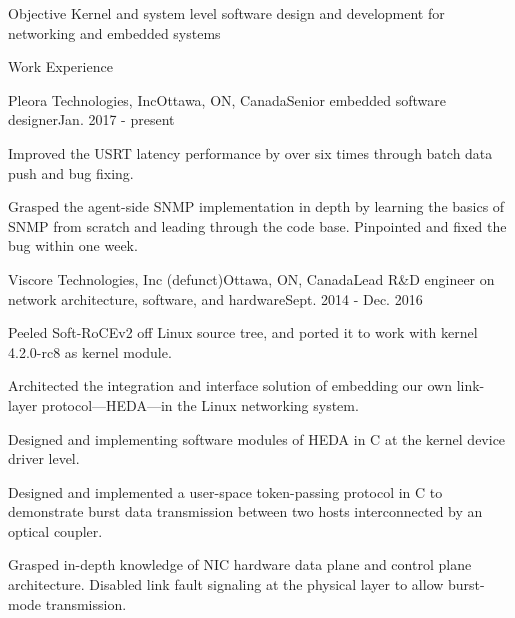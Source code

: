 \documentclass{resume} %
\begin{document}

\begin{rSection}{Objective}
Kernel and system level software design and development for networking and embedded systems
\end{rSection}


\begin{rSection}{Work Experience}

\begin{rSubsection}{Pleora Technologies, Inc}{Ottawa, ON, Canada}{Senior embedded software designer}{Jan. 2017 - present}
\item Improved the USRT latency performance by over six times through batch data push and bug fixing.
\item Grasped the agent-side SNMP implementation in depth by learning the basics of SNMP from scratch and leading through the code base.
Pinpointed and fixed the bug within one week.
\end{rSubsection}


\begin{rSubsection}{Viscore Technologies, Inc (defunct)}{Ottawa, ON, Canada}{Lead R\&D engineer on network architecture, software, and hardware}{Sept. 2014 - Dec. 2016}
\item Peeled Soft-RoCEv2 off Linux source tree, and ported it to work with kernel 4.2.0-rc8 as kernel module.
\item Architected the integration and interface solution of embedding our own link-layer protocol---HEDA---in the Linux networking system.
\item Designed and implementing software modules of HEDA in C at the kernel device driver level.
\item Designed and implemented a user-space token-passing protocol in C to demonstrate burst data transmission between two hosts interconnected by an optical coupler.
\item Grasped in-depth knowledge of NIC hardware data plane and control plane architecture. Disabled link fault signaling at the physical layer to allow burst-mode transmission.
\end{rSubsection}


\end{rSection}
\end{document}
